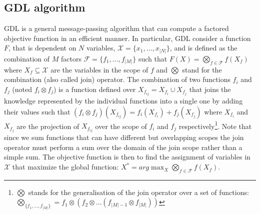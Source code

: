 \documentclass{aamas2012}
\begin{document}
\vspace{-0.05in}\subsection{GDL algorithm}
\label{sec:gdl_message_passing}
\noindent GDL \cite{DBLP:journals/tit/AjiM00} is a general message-passing
algorithm that can compute a factored objective function in an efficient manner. 
In particular, GDL consider a function $F$, that is dependent on $N$ variables,
$\mathcal{X}=\{x_1,\ldots,x_{\vert N \vert}\}$, and is defined as the
combination of $M$ factors $\mathcal{F}=\{f_1,\ldots,f_{\vert M \vert}\}$ such
that $F(X) = \bigotimes_{f\in \mathcal{F}} f(X_f)$ where $X_f\subseteq
\mathcal{X}$ are the variables in the scope of $f$ and $\bigotimes$ stand for
the combination (also called join) operator. The combination of two functions
$f_i$ and $f_j$ (noted $f_i\otimes f_j$) is a function defined over
$X_{f_{ij}}=X_{f_i}\cup X_{f_j}$ that joins the knowledge represented by the
individual functions into a single one by adding their values such that
$(f_i\otimes f_j)(X_{f_{ij}})= f_i(X_{f_i}) + f_j(X_{f_j})$ where $X_{f_i}$ and
$X_{f_j}$ are the projection of $X_{f_{ij}}$ over the scope of $f_i$
and $f_j$ respectively\footnote{$\bigotimes$ stands for the generalisation
of the join operator over a set of functions: $ \bigotimes_{\{f_1,
\ldots, f_{\vert M \vert} \} } = f_1 \otimes ( f_2 \otimes \ldots (f_{\vert M
\vert-1} \otimes f_{\vert M\vert}))$}. Note that since we sum functions that can
have different but overlapping scopes the join operator must perform a 
sum over the domain of the join scope rather than a simple sum.
The
objective function is then to find the assignment of variables in $\mathcal{X}$
that maximize the global function: $X^*=arg \max_{X} \bigotimes_{f\in
\mathcal{F}} f(X_f)$.
\end{document}
